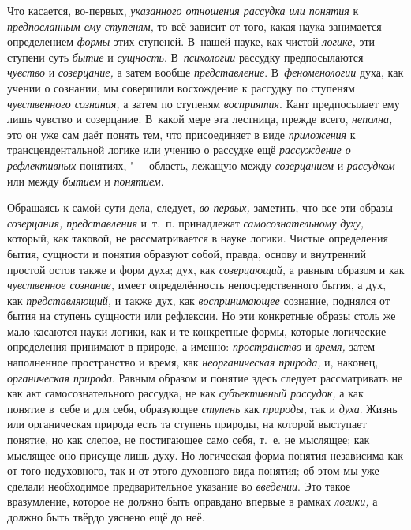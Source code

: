 Что касается, во-первых, {\em указанного отношения рассудка или понятия}
к {\em предпосланным ему ступеням,} то всё зависит от того, какая наука
занимается определением {\em формы} этих ступеней. В~нашей науке, как
чистой {\em логике,} эти ступени суть {\em бытие} и {\em сущность}.
В~{\em психологии} рассудку предпосылаются {\em чувство} и
{\em созерцание,} а затем вообще {\em представление}. В~{\em феноменологии}
духа, как учении о сознании, мы совершили восхождение к рассудку по
ступеням {\em чувственного сознания,} а затем по ступеням
{\em восприятия}. Кант предпосылает ему лишь чувство и созерцание. В~какой
мере эта лестница, прежде всего, {\em неполна,} это он уже сам даёт
понять тем, что присоединяет в виде {\em приложения} к трансцендентальной
логике или учению о рассудке ещё {\em рассуждение о рефлективных}
понятиях, "--- область, лежащую между {\em созерцанием} и {\em рассудком}
или между {\em бытием} и {\em понятием}.

Обращаясь к самой сути дела, следует, {\em во-первых,}
заметить, что все эти образы {\em созерцания, представления}
и~т.~п. принадлежат {\em самосознательному духу,}
который, как таковой, не рассматривается в науке логики.
Чистые определения бытия, сущности и понятия образуют собой, правда, основу
и внутренний простой остов также и форм духа; дух, как
{\em созерцающий,} а равным образом и как {\em чувственное сознание,}
имеет определённость непосредственного бытия, а дух, как {\em представляющий,}
и также дух, как {\em воспринимающее}
сознание, поднялся от бытия на ступень сущности или
рефлексии. Но эти конкретные образы столь же мало касаются науки логики,
как и те конкретные формы, которые логические определения принимают в
природе, а именно: {\em пространство} и {\em время,}
затем наполненное пространство и время, как
{\em неорганическая природа,} и, наконец, {\em органическая природа}.
Равным образом и понятие здесь следует рассматривать не как
акт самосознательного рассудка, не как {\em субъективный рассудок,}
а как понятие в~себе и для себя, образующее {\em ступень} как
{\em природы,} так и {\em духа}. Жизнь или
органическая природа есть та ступень природы, на которой выступает понятие,
но как слепое, не постигающее само себя, т.~е. не мыслящее; как мыслящее
оно присуще лишь духу. Но логическая форма понятия независима как от того
недуховного, так и от этого духовного вида понятия; об этом мы уже сделали
необходимое предварительное указание во {\em введении}. Это такое
вразумление, которое не должно быть оправдано впервые в рамках
{\em логики,} а должно быть твёрдо уяснено ещё до неё.


